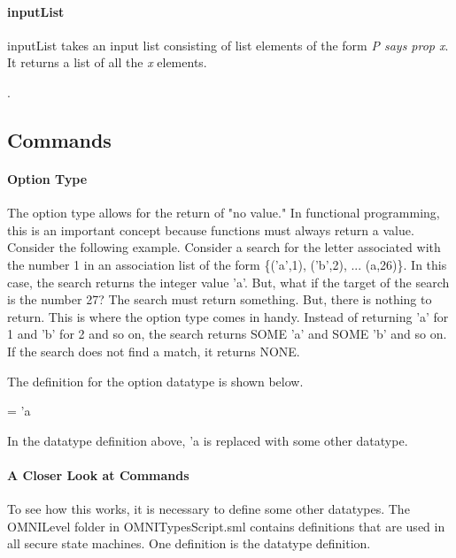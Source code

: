 \documentclass[../../main/main.tex]{subfiles}
\begin{document}
\paragraph*{inputList}
inputList takes an input list consisting of list elements of the form \textit{P says prop x}.  It returns a list of all the \textit{x} elements.
\begin{tabbing}
\parskip=8pt
\HOLTokenTurnstile{} \HOLSymConst{\HOLTokenForall{}}. \\
\hspace{0.3cm}   \HOLSymConst{=}   
\parskip=18pt
\end{tabbing}


\subsection{Commands}
\paragraph*{Option Type}
The option type allows for the return of "no value."  In functional programming, this is an important concept because functions must always return a value.  Consider the following example.
Consider a search for the letter associated with the number 1 in an association list of the form \{('a',1), ('b',2), ... (a,26)\}. In this case, the search returns the integer value 'a'.  But, what if the target of the search is the number 27?  The search must return something.  But, there is nothing to return.  This is where the option type comes in handy.  Instead of returning 'a' for 1 and 'b' for 2 and so on, the search returns SOME 'a' and SOME 'b' and so on.  If the search does not find a match, it returns NONE.

The definition for the option datatype is shown below.

 =  \HOLTokenBar{}  'a

In the datatype definition above, 'a is replaced with some other datatype.  

\paragraph*{A Closer Look at Commands}
To see how this works, it is necessary to define some other datatypes. The OMNILevel folder in OMNITypesScript.sml contains definitions that are used in all secure state machines. One definition is the  datatype definition.
\end{document}
